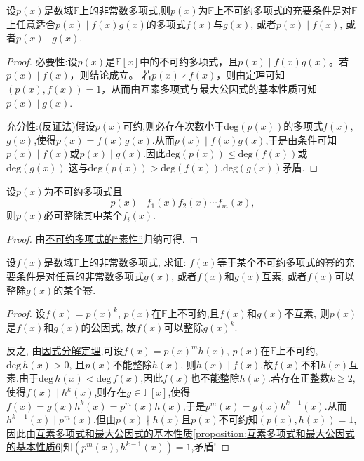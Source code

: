 \documentclass[../../main.tex]{subfiles}
\begin{document}
\begin{theorem}[不可约多项式的“素性”]\label{theorem:不可约多项式的“素性”}
设\(p(x)\)是数域\(\mathbb{F}\)上的非常数多项式,则\(p(x)\)为\(\mathbb{F}\)上不可约多项式的充要条件是对\(\mathbb{F}\)上任意适合\(p(x)\mid f(x)g(x)\)的多项式\(f(x)\)与\(g(x)\), 或者\(p(x)\mid f(x)\), 或者\(p(x)\mid g(x)\).
\end{theorem}
\begin{proof}
必要性:设\(p(x)\)是\(\mathbb{F}[x]\)中的不可约多项式，且\(p(x)\mid f(x)g(x)\)。若\(p(x)\mid f(x)\)，则结论成立。
若\(p(x)\nmid f(x)\)，则由定理可知\((p(x),f(x)) = 1\)，从而由互素多项式与最大公因式的基本性质可知\(p(x)\mid g(x)\).

充分性:(反证法)假设\(p(x)\)可约,则必存在次数小于\(\text{deg}(p(x))\)的多项式\(f(x)\),\(g(x)\),使得\(p(x) = f(x)g(x)\).从而\(p(x) \mid f(x)g(x)\),于是由条件可知\(p(x) \mid f(x)\)或\(p(x) \mid g(x)\).因此\(\text{deg}(p(x)) \leqslant  \text{deg}(f(x))\)或\(\text{deg}(g(x))\).这与\(\text{deg}(p(x)) > \text{deg}(f(x))\),\(\text{deg}(g(x))\)矛盾.

\end{proof}

\begin{corollary}\label{corollary:不可约多项式“素性”的推论}
设\(p(x)\)为不可约多项式且
\[
p(x)\mid f_1(x)f_2(x)\cdots f_m(x),
\]
则\(p(x)\)必可整除其中某个\(f_i(x)\).
\end{corollary}
\begin{proof}
由\hyperref[theorem:不可约多项式的“素性”]{不可约多项式的“素性”}归纳可得.

\end{proof}

\begin{proposition}\label{proposition:多项式可以写成不可约多项式的幂的充要条件}
设\(f(x)\)是数域\(\mathbb{F}\)上的非常数多项式, 求证: \(f(x)\)等于某个不可约多项式的幂的充要条件是对任意的非常数多项式\(g(x)\), 或者\(f(x)\)和\(g(x)\)互素, 或者\(f(x)\)可以整除\(g(x)\)的某个幂.
\end{proposition}
\begin{proof}
设\(f(x)=p(x)^k\), \(p(x)\)在\(\mathbb{F}\)上不可约,且\(f(x)\)和\(g(x)\)不互素, 则\(p(x)\)是\(f(x)\)和\(g(x)\)的公因式, 故\(f(x)\)可以整除\(g(x)^k\).

反之, 由\hyperref[theorem:因式分解定理]{因式分解定理},可设\(f(x)=p(x)^mh(x)\), \(p(x)\)在\(\mathbb{F}\)上不可约, \(\mathrm{deg }\,h(x)>0\), 且\(p(x)\)不能整除\(h(x)\), 则\(h(x)\mid f(x)\),故$f(x)$不和$h(x)$互素.由于$\mathrm{deg}\,h(x)<\mathrm{deg }\,f(x)$,因此$f(x)$也不能整除\(h(x)\).若存在正整数$k\geqslant 2$,使得$f(x)\mid h^k(x)$,则存在$g\in \mathbb{F}[x]$,使得$f(x)=g(x)h^k(x)=p^m(x)h(x)$,于是$p^m(x)=g(x)h^{k-1}(x)$.从而$h^{k-1}(x)\mid p^m(x)$.但由$p(x)\nmid h(x)$且$p(x)$不可约知$(p(x),h(x))=1$,因此由\hyperref[proposition:互素多项式和最大公因式的基本性质6]{互素多项式和最大公因式的基本性质\ref{proposition:互素多项式和最大公因式的基本性质6}}知$(p^m(x),h^{k-1}(x))=1$,矛盾!

\end{proof}
\end{document}
